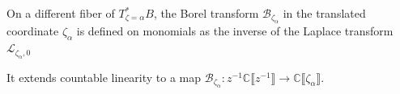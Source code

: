 \documentclass{article}
\newcommand{\maps}{\colon}
\newcommand{\C}{\mathbb{C}}
\newcommand{\laplace}{\mathcal{L}}
\newcommand{\borel}{\mathcal{B}}
\theoremstyle{definition}
\theoremstyle{plain}
\begin{document}
On a different fiber of $T_{\zeta=\alpha}^*B$, the Borel transform $\borel_{\zeta_\alpha}$ in the translated coordinate $\zeta_\alpha$ is defined on monomials as the inverse of the Laplace transform $\laplace_{\zeta_\alpha,0}$
\begin{center}
\end{center}
It extends countable linearity to a map $\borel_{\zeta_\alpha} \maps z^{-1} \C \llbracket z^{-1} \rrbracket  \to \C \llbracket \zeta_\alpha \rrbracket$.
%
\end{document}
